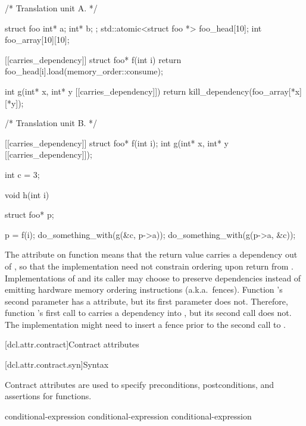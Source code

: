 \pnum
\begin{example}
\begin{codeblock}
/* Translation unit A. */

struct foo { int* a; int* b; };
std::atomic<struct foo *> foo_head[10];
int foo_array[10][10];

[[carries_dependency]] struct foo* f(int i) {
  return foo_head[i].load(memory_order::consume);
}

int g(int* x, int* y [[carries_dependency]]) {
  return kill_dependency(foo_array[*x][*y]);
}

/* Translation unit B. */

[[carries_dependency]] struct foo* f(int i);
int g(int* x, int* y [[carries_dependency]]);

int c = 3;

void h(int i) {
  struct foo* p;

  p = f(i);
  do_something_with(g(&c, p->a));
  do_something_with(g(p->a, &c));
}
\end{codeblock}

The  attribute on function  means that the
return value carries a dependency out of , so that the implementation
need not constrain ordering upon return from . Implementations of
 and its caller may choose to preserve dependencies instead of emitting
hardware memory ordering instructions (a.k.a.\ fences).
Function 's second parameter has a  attribute,
but its first parameter does not. Therefore, function 's first call to
 carries a dependency into , but its second call does not. The
implementation might need to insert a fence prior to the second call to
.
\end{example}%
%

[dcl.attr.contract]{Contract attributes}%

[dcl.attr.contract.syn]{Syntax}

\pnum
Contract attributes are used to specify
preconditions, postconditions, and assertions for functions.

\begin{bnf}
\br
  \terminal{[} \terminal{[}   \terminal{:} conditional-expression \terminal{]} \terminal{]}\br
  \terminal{[} \terminal{[}    \terminal{:} conditional-expression \terminal{]} \terminal{]}\br
    \terminal{[} \terminal{[}   \terminal{:} conditional-expression \terminal{]} \terminal{]}
\end{bnf}

